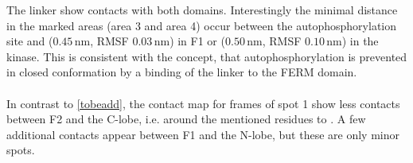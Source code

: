 The linker show contacts with both domains. Interestingly the minimal distance in the marked areas (area 3 and area 4) occur between the autophosphorylation site  and  ($0.45\,\si{\nano\metre}$, RMSF $0.03\,\si{\nano\metre}$) in F1 or  ($0.50\,\si{\nano\metre}$, RMSF $0.10\,\si{\nano\metre}$) in the kinase. This is consistent with the concept, that autophosphorylation is prevented in closed conformation by a binding of the linker to the FERM domain.\\
\\
In contrast to \autoref{tobeadd}, the contact map for frames of spot 1 show less contacts between F2 and the C-lobe, i.e. around the mentioned residues  to . A few additional contacts appear between F1 and the N-lobe, but these are only minor spots.